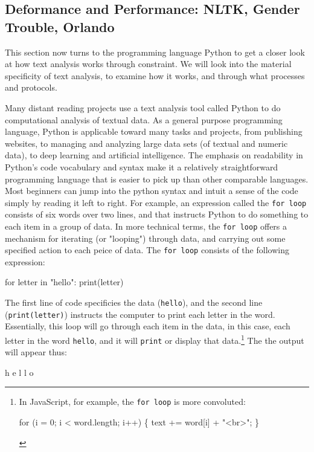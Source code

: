 \documentclass[11pt]{article}
\begin{document}
\subsection{Deformance and Performance: NLTK, Gender Trouble, Orlando}
\label{sec:org95a30a2}

This section now turns to the programming language Python to get a
closer look at how text analysis works through constraint. We will
look into the material specificity of text analysis, to examine how it
works, and through what processes and protocols.

Many distant reading projects use a text analysis tool called Python
to do computational analysis of textual data. As a general purpose
programming language, Python is applicable toward many tasks and
projects, from publishing websites, to managing and analyzing large
data sets (of textual and numeric data), to deep learning and
artificial intelligence. The emphasis on readability in Python's code
vocabulary and syntax make it a relatively straightforward programming
language that is easier to pick up than other comparable
languages. Most beginners can jump into the python syntax and intuit a
sense of the code simply by reading it left to right. For example, an
expression called the \texttt{for loop} consists of six words over two lines,
and that instructs Python to do something to each item in a group of
data. In more technical terms, the \texttt{for loop} offers a mechanism for
iterating (or "looping") through data, and carrying out some specified
action to each peice of data. The \texttt{for loop} consists of the following
expression:

\begin{SOURCE}
for letter in "hello":
    print(letter)
\end{SOURCE}

The first line of code specificies the data (\texttt{hello}), and the
second line (\texttt{print(letter)}) instructs the computer to print each
letter in the word. Essentially, this loop will go through each item
in the data, in this case, each letter in the word \texttt{hello}, and it
will \texttt{print} or display that data.\footnote{In JavaScript, for example, the \texttt{for loop} is more convoluted:

\begin{SOURCE}
for (i = 0; i < word.length; i++) \{
  text += word[i] + "<br>";
\} 
\end{SOURCE}} The the output will appear
thus:

\begin{SOURCE}
h
e
l
l
o
\end{SOURCE}
\end{document}
